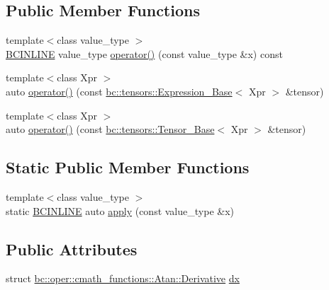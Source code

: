 \subsection*{Public Member Functions}
\begin{DoxyCompactItemize}
\item 
{\footnotesize template$<$class value\+\_\+type $>$ }\\\hyperlink{common_8h_a6699e8b0449da5c0fafb878e59c1d4b1}{B\+C\+I\+N\+L\+I\+NE} value\+\_\+type \hyperlink{structbc_1_1oper_1_1cmath__functions_1_1Atan_a1282c1530ebf9628cd6c95a158787c2c}{operator()} (const value\+\_\+type \&x) const
\item 
{\footnotesize template$<$class Xpr $>$ }\\auto \hyperlink{structbc_1_1oper_1_1cmath__functions_1_1Atan_a8df17012bbd853264f0220706adb637a}{operator()} (const \hyperlink{classbc_1_1tensors_1_1Expression__Base}{bc\+::tensors\+::\+Expression\+\_\+\+Base}$<$ Xpr $>$ \&tensor)
\item 
{\footnotesize template$<$class Xpr $>$ }\\auto \hyperlink{structbc_1_1oper_1_1cmath__functions_1_1Atan_a8886ec51e68cc92caba84b031d3acdf9}{operator()} (const \hyperlink{classbc_1_1tensors_1_1Tensor__Base}{bc\+::tensors\+::\+Tensor\+\_\+\+Base}$<$ Xpr $>$ \&tensor)
\end{DoxyCompactItemize}
\subsection*{Static Public Member Functions}
\begin{DoxyCompactItemize}
\item 
{\footnotesize template$<$class value\+\_\+type $>$ }\\static \hyperlink{common_8h_a6699e8b0449da5c0fafb878e59c1d4b1}{B\+C\+I\+N\+L\+I\+NE} auto \hyperlink{structbc_1_1oper_1_1cmath__functions_1_1Atan_a8ee1b987b30be5bd14dfd71f6f112fbe}{apply} (const value\+\_\+type \&x)
\end{DoxyCompactItemize}
\subsection*{Public Attributes}
\begin{DoxyCompactItemize}
\item 
struct \hyperlink{structbc_1_1oper_1_1cmath__functions_1_1Atan_1_1Derivative}{bc\+::oper\+::cmath\+\_\+functions\+::\+Atan\+::\+Derivative} \hyperlink{structbc_1_1oper_1_1cmath__functions_1_1Atan_a6298e19488a3e83b2012798de1f8406a}{dx}
\end{DoxyCompactItemize}


